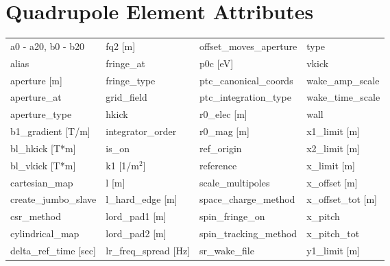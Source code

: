  \section{Quadrupole Element Attributes}
 \label{s:list.quadrupole}
 
 \begin{tabular}{llll} \toprule
a0 - a20, b0 - b20             & fq2 [m]                        & offset_moves_aperture          & type                           \\
alias                          & fringe_at                      & p0c [eV]                       & vkick                          \\
aperture [m]                   & fringe_type                    & ptc_canonical_coords           & wake_amp_scale                 \\
aperture_at                    & grid_field                     & ptc_integration_type           & wake_time_scale                \\
aperture_type                  & hkick                          & r0_elec [m]                    & wall                           \\
b1_gradient [T/m]              & integrator_order               & r0_mag [m]                     & x1_limit [m]                   \\
bl_hkick [T*m]                 & is_on                          & ref_origin                     & x2_limit [m]                   \\
bl_vkick [T*m]                 & k1 [1/m$^2$]                   & reference                      & x_limit [m]                    \\
cartesian_map                  & l [m]                          & scale_multipoles               & x_offset [m]                   \\
create_jumbo_slave             & l_hard_edge [m]                & space_charge_method            & x_offset_tot [m]               \\
csr_method                     & lord_pad1 [m]                  & spin_fringe_on                 & x_pitch                        \\
cylindrical_map                & lord_pad2 [m]                  & spin_tracking_method           & x_pitch_tot                    \\
delta_ref_time [sec]           & lr_freq_spread [Hz]            & sr_wake_file                   & y1_limit [m]                   \\

\end{tabular}
